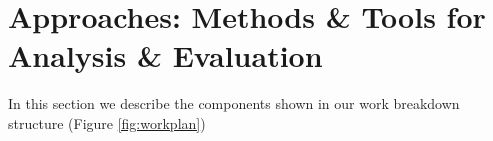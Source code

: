 \section{Approaches: Methods \& Tools for Analysis \& Evaluation}
In this section we describe the components shown in our work breakdown structure (Figure \ref{fig:workplan})












